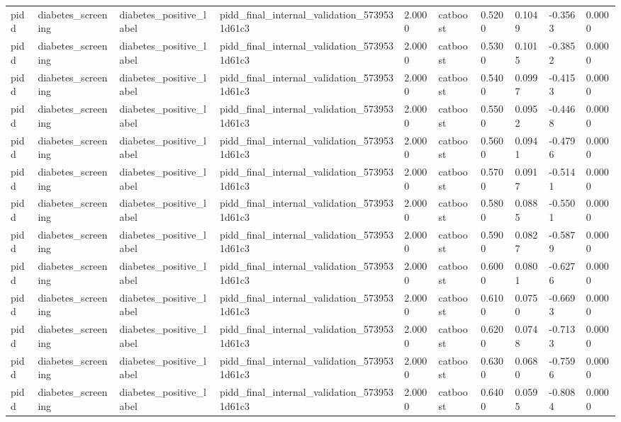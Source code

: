 \begin{tabular}{llllllllll}
pidd & diabetes\_screening & diabetes\_positive\_label & pidd\_final\_internal\_validation\_5739531d61c3 & 2.0000 & catboost & 0.5200 & 0.1049 & -0.3563 & 0.0000 \\
pidd & diabetes\_screening & diabetes\_positive\_label & pidd\_final\_internal\_validation\_5739531d61c3 & 2.0000 & catboost & 0.5300 & 0.1015 & -0.3852 & 0.0000 \\
pidd & diabetes\_screening & diabetes\_positive\_label & pidd\_final\_internal\_validation\_5739531d61c3 & 2.0000 & catboost & 0.5400 & 0.0997 & -0.4153 & 0.0000 \\
pidd & diabetes\_screening & diabetes\_positive\_label & pidd\_final\_internal\_validation\_5739531d61c3 & 2.0000 & catboost & 0.5500 & 0.0952 & -0.4468 & 0.0000 \\
pidd & diabetes\_screening & diabetes\_positive\_label & pidd\_final\_internal\_validation\_5739531d61c3 & 2.0000 & catboost & 0.5600 & 0.0941 & -0.4796 & 0.0000 \\
pidd & diabetes\_screening & diabetes\_positive\_label & pidd\_final\_internal\_validation\_5739531d61c3 & 2.0000 & catboost & 0.5700 & 0.0917 & -0.5141 & 0.0000 \\
pidd & diabetes\_screening & diabetes\_positive\_label & pidd\_final\_internal\_validation\_5739531d61c3 & 2.0000 & catboost & 0.5800 & 0.0885 & -0.5501 & 0.0000 \\
pidd & diabetes\_screening & diabetes\_positive\_label & pidd\_final\_internal\_validation\_5739531d61c3 & 2.0000 & catboost & 0.5900 & 0.0827 & -0.5879 & 0.0000 \\
pidd & diabetes\_screening & diabetes\_positive\_label & pidd\_final\_internal\_validation\_5739531d61c3 & 2.0000 & catboost & 0.6000 & 0.0801 & -0.6276 & 0.0000 \\
pidd & diabetes\_screening & diabetes\_positive\_label & pidd\_final\_internal\_validation\_5739531d61c3 & 2.0000 & catboost & 0.6100 & 0.0750 & -0.6693 & 0.0000 \\
pidd & diabetes\_screening & diabetes\_positive\_label & pidd\_final\_internal\_validation\_5739531d61c3 & 2.0000 & catboost & 0.6200 & 0.0748 & -0.7133 & 0.0000 \\
pidd & diabetes\_screening & diabetes\_positive\_label & pidd\_final\_internal\_validation\_5739531d61c3 & 2.0000 & catboost & 0.6300 & 0.0680 & -0.7596 & 0.0000 \\
pidd & diabetes\_screening & diabetes\_positive\_label & pidd\_final\_internal\_validation\_5739531d61c3 & 2.0000 & catboost & 0.6400 & 0.0595 & -0.8084 & 0.0000 \\

\end{tabular}
